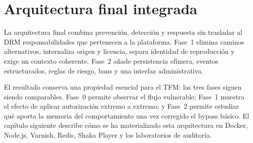 \section{Arquitectura final integrada}

La arquitectura final combina prevención, detección y respuesta sin trasladar al DRM responsabilidades que pertenecen a la plataforma. Fase~1 elimina caminos alternativos, internaliza origen y licencia, separa identidad de reproducción y exige un contexto coherente. Fase~2 añade persistencia efímera, eventos estructurados, reglas de riesgo, bans y una interfaz administrativa.

El resultado conserva una propiedad esencial para el TFM: las tres fases siguen siendo comparables. Fase~0 permite observar el flujo vulnerable; Fase~1 muestra el efecto de aplicar autorización extremo a extremo; y Fase~2 permite estudiar qué aporta la memoria del comportamiento una vez corregido el bypass básico. El capítulo siguiente describe cómo se ha materializado esta arquitectura en Docker, Node.js, Varnish, Redis, Shaka Player y los laboratorios de auditoría.
